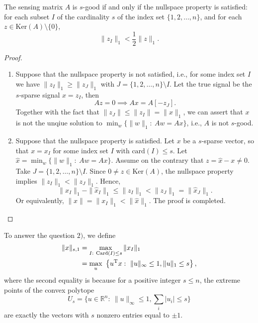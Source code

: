\begin{proposition}
The sensing matrix $A$ is $s$-good if and only if the nullspace property is satisfied:
for each subset $I$ of the cardinality $s$ of the index set $\{1,2,\ldots,n\}$, and for each $z\in\text{Ker}(A)\setminus\{0\}$,
\[
\|z_I\|_1<\frac{1}{2}\|z\|_1.
\]
\end{proposition}
\begin{proof}
\begin{enumerate}
\item
Suppose that the nullspace property is not satisfied, i.e., for some index set $I$ we have $\|z_I\|_1\ge \|z_J\|_1$ with $J=\{1,2,\ldots,n\}\setminus I$.
Let the true signal be the $s$-sparse signal $x=z_I$, then
\[
Az=0\implies Ax=A[-z_J].
\]
Together with the fact that $\|z_J\|\le\|z_I\|=\|x\|_1$, we can assert that $x$ is not the unqiue solution to $\min_w\{\|w\|_1:~Aw=Ax\}$, i.e., $A$ is not $s$-good.
\item
Suppose that the nullspace property is satisfied.
Let $x$ be a $s$-sparse vector, so that $x=x_I$ for some index set $I$ with $\text{card}(I)\le s$.
Let $\hat{x}=\min_w\{\|w\|_1:~Aw=Ax\}$.
Assume on the contrary that $z=\hat{x}-x\ne0$. Take $J=\{1,2,\ldots,n\}\setminus I$.
Since $0\ne z\in\text{Ker}(A)$, the nullspace property implies $\|z_I\|_1<\|z_J\|_1$.
Hence,
\[
\|x_I\|_1 - \|\hat{x}_I\|_1\le \|z_I\|_1<\|z_J\|_1=\|\hat{x}_J\|_1.
\]
Or equivalently, $\|x\|=\|x_I\|_1<\|\hat{x}\|_1$. The proof is completed.
\end{enumerate}
\end{proof}
To answer the question $2)$, we define
\begin{align*}
\|x\|_{s,1}&=\max_{I:~\text{Card}(I)\le s}\|x_I\|_1\\
&=\max_{u}~\left\{
u^{\mathrm T} x:~
\|u\|_\infty\le 1, \|u\|_1\le s
\right\},
\end{align*}
where the second equality is because for a positive integer $s\le n$, the extreme points of the convex polytope \[U_s=\{u\in\mathbb{R}^n:~\|u\|_\infty\le 1, \sum_i|u_i|\le s\}\] are exactly the vectors with $s$ nonzero entries equal to $\pm1$.

